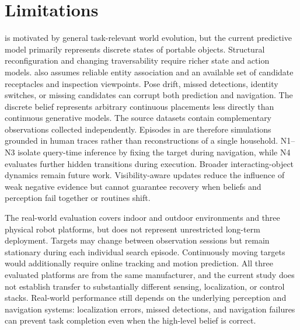 \section{Limitations}

\evolvingworldnav{} is motivated by general task-relevant world evolution, but
the current predictive model primarily represents discrete states of portable
objects. Structural reconfiguration and changing traversability require richer
state and action models. \pfdnav{} also assumes reliable entity association
and an available set of candidate receptacles and inspection viewpoints. Pose
drift, missed detections, identity switches, or missing candidates can corrupt
both prediction and navigation. The discrete belief represents arbitrary
continuous placements less directly than continuous generative models. The
source datasets contain complementary observations collected independently.
Episodes in \evolvingworldbench{} are therefore simulations grounded in human
traces rather than reconstructions of a single household. N1--N3 isolate
query-time inference by fixing the target during navigation, while N4 evaluates
further hidden transitions during execution. Broader interacting-object
dynamics remain future work. Visibility-aware updates reduce the influence of
weak negative evidence but cannot guarantee recovery when beliefs and
perception fail together or routines shift.

The real-world evaluation covers indoor and outdoor environments and three
physical robot platforms, but does not represent unrestricted long-term
deployment. Targets may change between observation sessions but remain
stationary during each individual search episode. Continuously moving targets
would additionally require online tracking and motion prediction. All three
evaluated platforms are from the same manufacturer, and the current
study does not establish transfer to substantially different sensing,
localization, or control stacks. Real-world performance still depends
on the underlying perception and navigation systems: localization errors,
missed detections, and navigation failures can prevent task completion even
when the high-level belief is correct.
